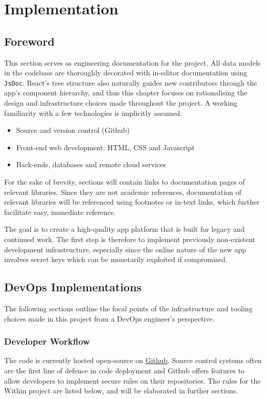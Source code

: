 \chapter{Implementation}
\section{Foreword}
This section serves as engineering documentation for the project. All data models in the codebase are thoroughly decorated with in-editor documentation using \texttt{JsDoc}. React's tree structure also naturally guides new contributors through the app's component hierarchy, and thus this chapter focuses on rationalising the design and infrastructure choices made throughout the project. A working familiarity with a few technologies is implicitly assumed:

\begin{itemize}
    \item Source and version control (Github)
    \item Front-end web development: HTML, CSS and Javascript
    \item Back-ends, databases and remote cloud services
\end{itemize}

For the sake of brevity, sections will contain links to documentation pages of relevant libraries. Since they are not academic references, documentation of relevant libraries will be referenced using footnotes or in-text links, which further facilitate easy, immediate reference.

The goal is to create a high-quality app platform that is built for legacy and continued work. The first step is therefore to implement previously non-existent development infrastructure, especially since the online nature of the new app involves secret keys which can be monetarily exploited if compromised.

\section{DevOps Implementations}
The following sections outline the focal points of the infrastructure and tooling choices made in this project from a DevOps engineer's perspective.

\subsection{Developer Workflow}
The code is currently hosted open-source on \href{https://github.com/Darrekt/within-react-native}{Github}. Source control systems often are the first line of defence in code deployment and Github offers features to allow developers to implement secure rules on their repositories. The rules for the Within project are listed below, and will be elaborated in further sections.

